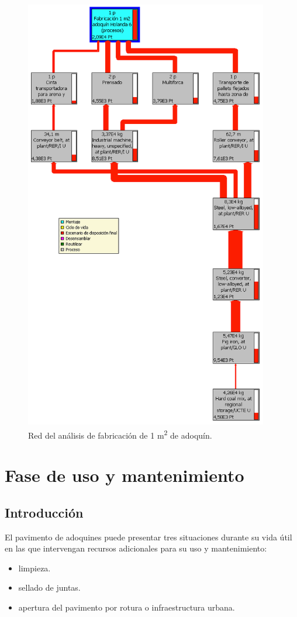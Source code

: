 \begin{figure}[!htb]
\centering
\includegraphics[height=19cm]{fabricacion_red.png}
\caption{Red del análisis de fabricación de 1 \si{m^2} de adoquín.}
\label{fig:redfabricacion}
\end{figure}

\section{Fase de uso y mantenimiento}

\subsection{Introducción}
El pavimento de adoquines puede presentar tres situaciones durante su vida útil en las que intervengan recursos adicionales para su uso y mantenimiento:
\begin{itemize}
\item limpieza.
\item sellado de juntas.
\item apertura del pavimento por rotura o infraestructura urbana.
\end{itemize}

